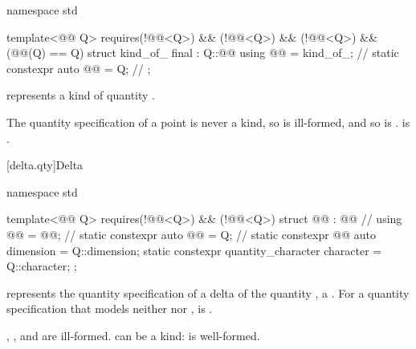\begin{codeblock}
namespace std {

template<@@ Q>
  requires(!@@<Q>) && (!@@<Q>) &&
           (!@@<Q>) && (@@(Q{}) == Q{})
struct kind_of_ final : Q::@@ {
  using @@ = kind_of_;                 // \expos
  static constexpr auto @@ = Q{};  // \expos
};

}
\end{codeblock}

\pnum
{} represents a kind of quantity .
\begin{note}
The quantity specification of a point is never a kind,
so  is ill-formed,
and so is .
 is .
\end{note}

[delta.qty]{Delta}

\begin{codeblock}
namespace std {

template<@@ Q>
  requires(!@@<Q>) && (!@@<Q>)
struct @@ : @@ {  // \expos
  using @@ = @@;                    // \expos
  static constexpr auto @@ = Q{};           // \expos
  static constexpr @@ auto dimension = Q::dimension;
  static constexpr quantity_character character = Q::character;
};

}
\end{codeblock}

\pnum
{} represents the quantity specification of a delta
of the quantity , a .
For a quantity specification  that models neither 
nor ,
 is .
\begin{note}
, , and
 are ill-formed.
 can be a kind:  is well-formed.
\end{note}

